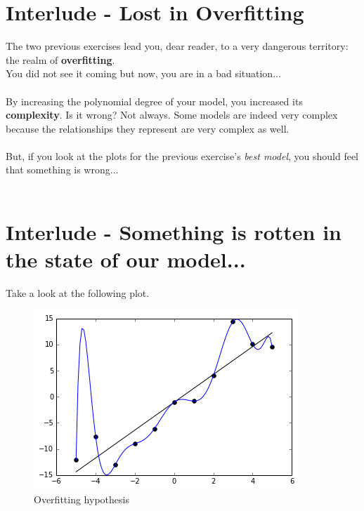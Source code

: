 
\section*{Interlude - Lost in Overfitting}

The two previous exercises lead you, dear reader, to a very dangerous territory: the realm of \textbf{overfitting}.\\
You did not see it coming but now, you are in a bad situation...\\
\\
By increasing the polynomial degree of your model, you increased its \textbf{complexity}.  
Is it wrong?
Not always.
Some models are indeed very complex because the relationships they represent are very complex as well.\\
\\
But, if you look at the plots for the previous exercise's \textit{best model}, you should feel that something is wrong...\\
\\
\section*{Interlude - Something is rotten in the state of our model...}
Take a look at the following plot. 

\begin{figure}[!h]
    \centering
    \includegraphics[scale=0.6]{assets/overfitt.png}
    \caption{Overfitting hypothesis}
\end{figure}


